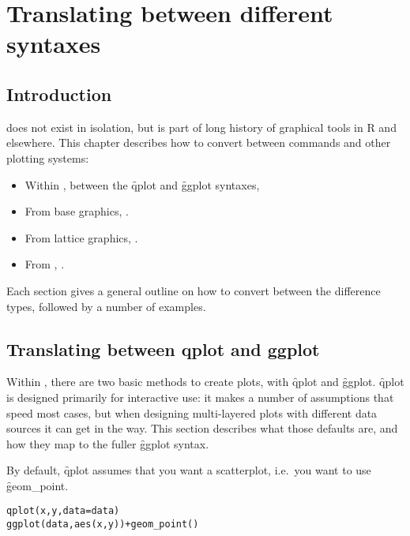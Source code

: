 
\chapter{Translating between different syntaxes}
\label{cha:translating}

\section{Introduction}

\ggplot does not exist in isolation, but is part of long history of graphical tools in R and elsewhere.  This chapter describes how to convert between \ggplot commands and other plotting systems:

\begin{itemize}
  \item Within \ggplot, between the \f{qplot} and \f{ggplot} syntaxes, 
  
  \item From base graphics, .

  \item From lattice graphics, .
  
  \item From , .
\end{itemize} 

Each section gives a general outline on how to convert between the difference types, followed by a number of examples.

\section{Translating between qplot and ggplot}
\label{sec:qplot-ggplot}

Within \ggplot, there are two basic methods to create plots, with \f{qplot} and \f{ggplot}.  \f{qplot} is designed primarily for interactive use: it makes a number of assumptions that speed most cases, but when designing multi-layered plots with different data sources it can get in the way.  This section describes what those defaults are, and how they map to the fuller 
\f{ggplot} syntax.  

By default, \f{qplot} assumes that you want a scatterplot, i.e.\ you want to use \f{geom_point}.

\begin{alltt}
qplot(x, y, data = data)
ggplot(data, aes(x, y)) + geom_point()
\end{alltt}

